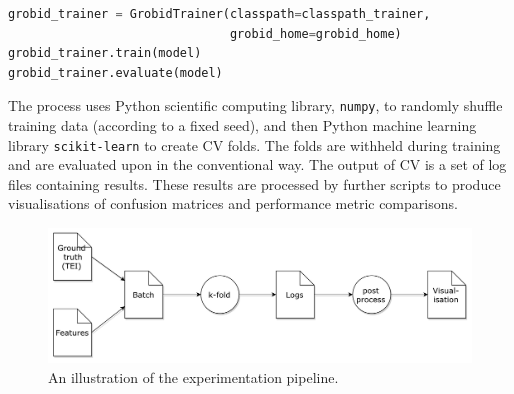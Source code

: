 \begin{lstlisting}[language=python, caption=Excerpt from our Python wrapper for GROBID, label={lst:grobid}]
grobid_trainer = GrobidTrainer(classpath=classpath_trainer,
                               grobid_home=grobid_home)
grobid_trainer.train(model)
grobid_trainer.evaluate(model)
\end{lstlisting}

The process uses Python scientific computing library, \texttt{numpy}, to randomly shuffle training data (according to a fixed seed), and then Python machine learning library \texttt{scikit-learn} to create CV folds. The folds are withheld during training and are evaluated upon in the conventional way. The output of CV is a set of log files containing results. These results are processed by further scripts to produce visualisations of confusion matrices and performance metric comparisons.

\begin{figure}[!ht]
\center
\includegraphics[width=\textwidth]{Figures/pipeline.pdf}
\caption{An illustration of the experimentation pipeline.}
\label{fig:pipeline}
\end{figure}
